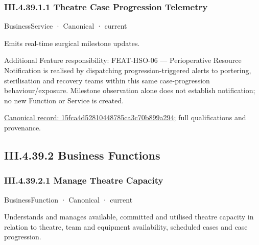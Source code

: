 \subsubsection*{III.4.39.1.1 Theatre Case Progression Telemetry}
\label{navigation:III.4.39.1.1}

\label{element:15fca4d52810448785ca3c70b899a294}
{\small BusinessService · Canonical · current}\par

Emits real-time surgical milestone updates.



Additional Feature responsibility: FEAT-HSO-06 — Perioperative Resource Notification is realised by dispatching progression-triggered alerts to portering, sterilisation and recovery teams within this same case-progression behaviour/exposure. Milestone observation alone does not establish notification; no new Function or Service is created.


{\footnotesize \href{../../../../continuum/business/business-service/15fca4d52810448785ca3c70b899a294.md}{Canonical record: 15fca4d52810448785ca3c70b899a294}; full qualifications and provenance.}\par
\subsection*{III.4.39.2 Business Functions}
\label{navigation:III.4.39.2}

\subsubsection*{III.4.39.2.1 Manage Theatre Capacity}
\label{navigation:III.4.39.2.1}

\label{element:3566d549770f490dba823fe3b0421446}
{\small BusinessFunction · Canonical · current}\par

Understands and manages available, committed and utilised theatre capacity in relation to theatre, team and equipment availability, scheduled cases and case progression.



